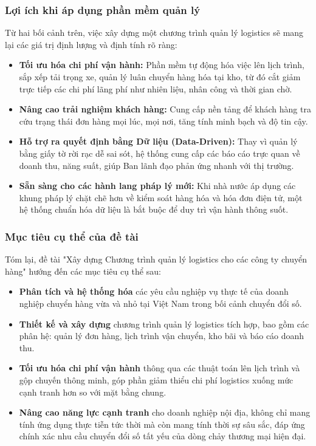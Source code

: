 \documentclass[12pt,a4paper]{article}
\begin{document}
\subsubsection{Lợi ích khi áp dụng phần mềm quản lý}

Từ hai bối cảnh trên, việc xây dựng một chương trình quản lý logistics sẽ mang lại các giá trị định lượng và định tính rõ ràng:

\begin{itemize}[label={\scalebox{1.2}{$\circ$}}, leftmargin=2em]
    \item \textbf{Tối ưu hóa chi phí vận hành:} Phần mềm tự động hóa việc lên lịch trình, sắp xếp tải trọng xe, quản lý luân chuyển hàng hóa tại kho, từ đó cắt giảm trực tiếp các chi phí lãng phí như nhiên liệu, nhân công và thời gian chờ.
    \item \textbf{Nâng cao trải nghiệm khách hàng:} Cung cấp nền tảng để khách hàng tra cứu trạng thái đơn hàng mọi lúc, mọi nơi, tăng tính minh bạch và độ tin cậy.
    \item \textbf{Hỗ trợ ra quyết định bằng Dữ liệu (Data-Driven):} Thay vì quản lý bằng giấy tờ rời rạc dễ sai sót, hệ thống cung cấp các báo cáo trực quan về doanh thu, năng suất, giúp Ban lãnh đạo phản ứng nhanh với thị trường.
    \item \textbf{Sẵn sàng cho các hành lang pháp lý mới:} Khi nhà nước áp dụng các khung pháp lý chặt chẽ hơn về kiểm soát hàng hóa và hóa đơn điện tử, một hệ thống chuẩn hóa dữ liệu là bắt buộc để duy trì vận hành thông suốt.
\end{itemize}

\subsubsection{Mục tiêu cụ thể của đề tài}

Tóm lại, đề tài "Xây dựng Chương trình quản lý logistics cho các công ty chuyển hàng" hướng đến các mục tiêu cụ thể sau:

\begin{itemize}[label={\scalebox{1.2}{$\circ$}}, leftmargin=2em]
	\item \textbf{Phân tích và hệ thống hóa} các yêu cầu nghiệp vụ thực tế của doanh nghiệp chuyển hàng vừa và nhỏ tại Việt Nam trong bối cảnh chuyển đổi số.
	\item \textbf{Thiết kế và xây dựng} chương trình quản lý logistics tích hợp, bao gồm các phân hệ: quản lý đơn hàng, lịch trình vận chuyển, kho bãi và báo cáo doanh thu.
	\item \textbf{Tối ưu hóa chi phí vận hành} thông qua các thuật toán lên lịch trình và gộp chuyến thông minh, góp phần giảm thiểu chi phí logistics xuống mức cạnh tranh hơn so với mặt bằng chung.
	\item \textbf{Nâng cao năng lực cạnh tranh} cho doanh nghiệp nội địa, không chỉ mang tính ứng dụng thực tiễn tức thời mà còn mang tính thời sự sâu sắc, đáp ứng chính xác nhu cầu chuyển đổi số tất yếu của dòng chảy thương mại hiện đại.
\end{itemize}
\end{document}
